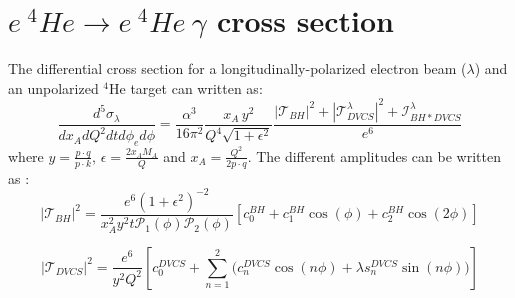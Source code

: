 \appendix
\chead[]{\let\uppercase\relax\leftmark}

\chapter{$e ~^4He \rightarrow e ~^4He ~\gamma$ cross section} \label{app:Helium_cross_section}
The differential cross section for a longitudinally-polarized electron beam ($\lambda$) and an unpolarized $^4$He target can written as:
\small
\begin{equation}
\frac{d^{5}\sigma_{\lambda}}{dx_{A} dQ^{2} dt d\phi_{e} d\phi} = 
\frac{\alpha^{3}}{16 \pi^{2}} \frac{x_{A} \, y^{2}}{Q^{4} \sqrt{1 + \epsilon ^{2}}} 
\frac{
|\mathcal{T}_{BH}|^{2} + |{\mathcal{T}}_{DVCS}^{\lambda}|^{2} + {\mathcal{I}}_{BH*DVCS}^{\lambda}}{e^{6}}
\label{eq:sigdiff}
\end{equation}
\normalsize
where $y = \frac{p \cdot q}{p \cdot k}$, $\epsilon  =  \frac{2 x_{A} M_{A}}{Q}$ 
and $x_A  =  \frac{Q^2}{2 p \cdot q}$. The different amplitudes can be written 
as \cite{BM_2009}:
\small
\begin{equation}
|\mathcal{T}_{BH}|^{2} =  
\frac{e^{6} (1 + \epsilon^{2})^{-2}}{x^{2}_{A} y^{2} t \mathcal{P}_{1}(\phi) \mathcal{P}_{2}(\phi)} \left[ c_{0}^{BH} + c_{1}^{BH} \cos(\phi) + c_{2}^{BH} \cos(2\phi)\right] 
\label{TTBH}
\end{equation}

\begin{equation}
|\mathcal{T}_{DVCS}|^{2} =  \frac{e^{6}}{y^{2} Q^{2}} \left[ c_{0}^{DVCS} + \sum_{n=1}^{2} \Bigg( c_{n}^{DVCS} \cos(n \phi) + \lambda s_{n}^{DVCS} \sin(n \phi)\Bigg) \right] 
\label{TTDVCS}
\end{equation}

